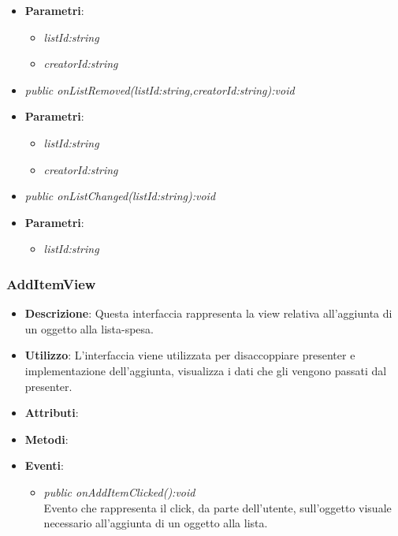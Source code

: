 \begin{itemize}
\begin{itemize}
			\item{\textbf{Parametri}: \begin{itemize}
			\item \textit{listId:string}\\

			\item \textit{creatorId:string}\\

			\end{itemize}}
	\item \textit{public onListRemoved(listId:string,creatorId:string):void}\\

			\item{\textbf{Parametri}: \begin{itemize}
			\item \textit{listId:string}\\

			\item \textit{creatorId:string}\\

			\end{itemize}}
	\item \textit{public onListChanged(listId:string):void}\\

			\item{\textbf{Parametri}: \begin{itemize}
			\item \textit{listId:string}\\

			\end{itemize}}
	\end{itemize}
\end{itemize}

\subsubsection{AddItemView}
\begin{itemize}
\item \textbf{Descrizione}: Questa interfaccia rappresenta la view relativa all'aggiunta di un oggetto alla lista-spesa.
\item \textbf{Utilizzo}: L'interfaccia viene utilizzata per disaccoppiare presenter e implementazione dell'aggiunta, visualizza i dati che gli vengono passati dal presenter.
\item \textbf{Attributi}: 
\item \textbf{Metodi}:
\item \textbf{Eventi}:
	\begin{itemize}	
	\item \textit{public onAddItemClicked():void}\\
	Evento che rappresenta il click, da parte dell'utente, sull'oggetto visuale necessario all'aggiunta di un oggetto alla lista.
	\end{itemize}
\end{itemize}

